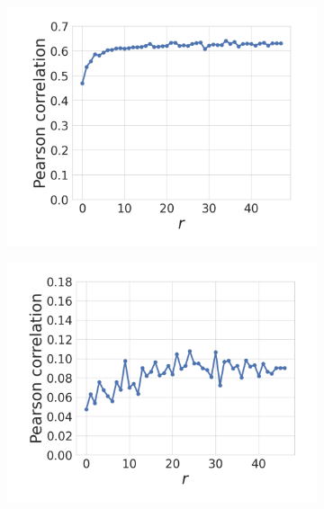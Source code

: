 \documentclass{article}
\begin{document}
\begin{figure}[H]
\centering
\begin{subfigure}[b]{0.23\linewidth} 
    \centering
    \includegraphics[width=\linewidth]{figures/EvalA_IMDB_Single_pearson.pdf}
    \caption{}
    \label{fig:EvalA_IMDB_Single_pearson}
\end{subfigure}
\begin{subfigure}[b]{0.23\linewidth} 
    \centering
    \includegraphics[width=\linewidth]{figures/EvalA_CommonCrawl_Single_pearson.pdf}
    \caption{}
    \label{fig:EvalA_CommonCrawl_Single_pearson}
\end{subfigure}
\begin{subfigure}[b]{0.23\linewidth}

\end{subfigure}
\end{figure}
\end{document}
